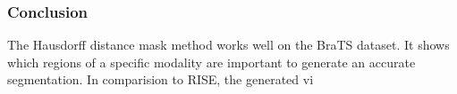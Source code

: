 \subsubsection{Conclusion}
The Hausdorff distance mask method works well on the BraTS dataset. It shows which regions of a specific modality are important to generate an accurate segmentation. In comparision to RISE, the generated vi